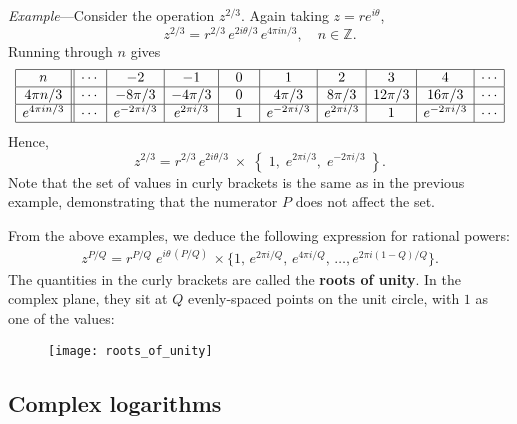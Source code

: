 \documentclass[10pt,a4paper]{article}
\begin{document}

\begin{framed} \noindent
  \textit{Example}---Consider the operation $z^{2/3}$. Again taking
  $z = re^{i\theta}$,
\begin{equation}
  z^{2/3} = r^{2/3} \, e^{2i\theta/3} \, e^{4\pi i n/3}, \quad n \in \mathbb{Z}.
\end{equation}
Running through $n$ gives
\begin{align*}
  \begin{array}{|c||c|c|c|c|c|c|c|c|c|} \hline n &\cdots & -2 & -1 & 0 & 1 & 2 & 3 & 4 & \cdots \\ \hline 4\pi n / 3 &\cdots & -8\pi/3 & -4\pi/3 & 0 & 4\pi/3 & 8\pi/3 & 12\pi/3 & 16\pi/3 & \cdots \\ \hline e^{4\pi i n/3} &\cdots & e^{-2\pi i /3} & e^{2\pi i /3} & \;\,\;1\;\,\; & e^{-2\pi i /3} & e^{2\pi i /3} & \;\,\;1\;\,\; & e^{-2\pi i /3} & \cdots \\ \hline \end{array}
\end{align*}
Hence,
\begin{equation}
z^{2/3} = r^{2/3} \, e^{2i\theta/3} \;\times\; \left\{\;1,\; e^{2\pi i /3},\; e^{-2\pi i /3}\;\right\}.
\end{equation}
Note that the set of values in curly brackets is the same as in the
previous example, demonstrating that the numerator $P$ does not affect
the set.
\end{framed}

\vskip 0.2in

From the above examples, we deduce the following expression for rational powers:
\begin{align}
  z^{P/Q} = r^{P/Q} \; e^{i\theta\, (P/Q)}\, \times \Big\{1,\, e^{2\pi i /Q},\, e^{4\pi i /Q},\, \dots, e^{2\pi i (1-Q)/Q} \Big\}.
\end{align}
The quantities in the curly brackets are called the \textbf{roots of
  unity}. In the complex plane, they sit at $Q$ evenly-spaced points
on the unit circle, with $1$ as one of the values:

\vskip 0.2in
\begin{figure}[ht]
  \centering\texttt{[image: roots\_of\_unity]}
\end{figure}

\clearpage

\subsection{Complex logarithms}\label{complex-logarithms}
\end{document}
